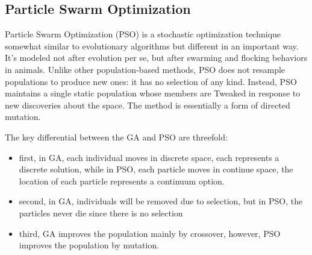         \subsection{Particle Swarm Optimization}
            Particle Swarm Optimization (PSO) is a stochastic optimization technique somewhat similar to evolutionary algorithms but different in an important way. It’s modeled not after evolution per se, but after swarming and flocking behaviors in animals. Unlike other population-based methods, PSO does not resample populations to produce new ones: it has no selection of any kind. Instead, PSO maintains a single static population whose members are Tweaked in response to new discoveries about the space. The method is essentially a form of directed mutation.

            The key differential between the GA and PSO are threefold: 
            \begin{itemize}
                \item first, in GA, each individual moves in discrete space, each represents a discrete solution, while in PSO, each particle moves in continue space, the location of each particle represents a continuum option.
                \item second, in GA, individuals will be removed due to selection, but in PSO, the particles never die since there is no selection
                \item third, GA improves the population mainly by crossover, however, PSO improves the population by mutation.
            \end{itemize} 

